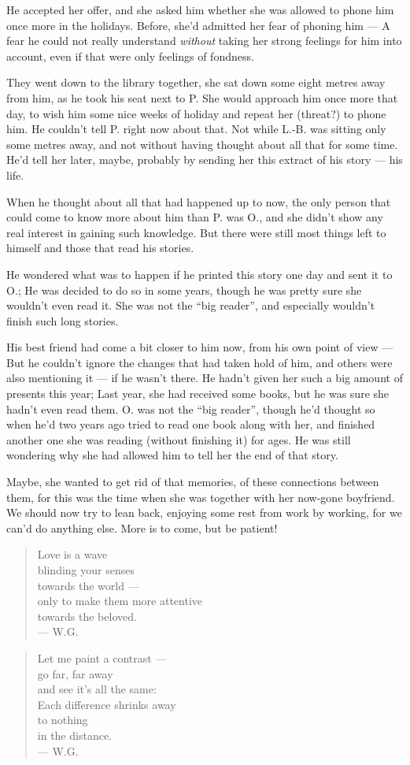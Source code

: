 He accepted her offer, and she asked him whether she was allowed to phone him once more in the holidays. Before, she'd admitted her fear of phoning him --- A fear he could not really understand \emph{without} taking her strong feelings for him into account, even if that were only feelings of fondness.

They went down to the library together, she sat down some eight metres away from him, as he took his seat next to P. 
She would approach him once more that day, to wish him some nice weeks of holiday and repeat her (threat?) to phone him. 
He couldn't tell P. right now about that. Not while L.-B. was sitting only some metres away, and not without having thought about all that for some time. 
He'd tell her later, maybe, probably by sending her this extract of his story --- his life.

When he thought about all that had happened up to now, the only person that could come to know more about him than P. was O., and she didn't show any real interest in gaining such knowledge. But there were still most things left to himself and those that read his stories.

He wondered what was to happen if he printed this story one day and sent it to O.; He was decided to do so in some years, though he was pretty sure she wouldn't even read it. She was not the \enquote{big reader}, and especially wouldn't finish such long stories.

His best friend had come a bit closer to him now, from his own point of view --- But he couldn't ignore the changes that had taken hold of him, and others were also mentioning it --- if he wasn't there. 
He hadn't given her such a big amount of presents this year; Last year, she had received some books, but he was sure she hadn't even read them. O. was not the \enquote{big reader}, though he'd thought so when he'd two years ago tried to read one book along with her, and finished another one she was reading (without finishing it) for ages. He was still wondering why she had allowed him to tell her the end of that story.

Maybe, she wanted to get rid of that memories, of these connections between them, for this was the time when she was together with her now-gone boyfriend. 
We should now try to lean back, enjoying some rest from work by working, for we can'd do anything else. More is to come, but be patient! 

\begin{quote}
Love is a wave \\
blinding your senses \\
towards the world --- \\
only to make them more attentive \\
towards the beloved. \\
--- W.G.
\end{quote}

\begin{quote}
Let me paint a contrast --- \\
go far, far away \\
and see it's all the same: \\
Each difference shrinks away \\
to nothing \\
in the distance. \\
--- W.G.
\end{quote}
